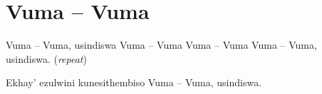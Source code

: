 \starttocol
\chapter{Vuma -- Vuma}
\nexttocol
\hfill{\it }
\stoptocol
\starttocol
\startlines
{\sc Vuma} -- Vuma, usindiswa
Vuma -- Vuma
Vuma -- Vuma
Vuma -- Vuma, usindiswa.
          \hfill({\it repeat})~~~~~~~~~

Ekhay' ezulwini kunesithembiso
Vuma -- Vuma, usindiswa.
\stoplines
\nexttocol

\stoptocol
